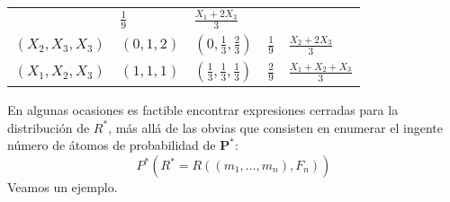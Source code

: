 \documentclass[
]{book}
\theoremstyle{definition}
\theoremstyle{definition}
\theoremstyle{definition}
\theoremstyle{remark}
\begin{document}
\begin{longtable}[]{@{}lllll@{}}
\begin{minipage}[t]{0.16\columnwidth}
\end{minipage} & \begin{minipage}[t]{0.17\columnwidth}\raggedright
\(\frac{1}{9}\)\strut
\end{minipage} & \begin{minipage}[t]{0.18\columnwidth}\raggedright
\(\frac{X_1+2X_3}{3}\)\strut
\end{minipage}\tabularnewline
\begin{minipage}[t]{0.18\columnwidth}\raggedright
\(\left( X_2,X_3,X_3 \right)\)\strut
\end{minipage} & \begin{minipage}[t]{0.16\columnwidth}\raggedright
\(\left( 0,1,2 \right)\)\strut
\end{minipage} & \begin{minipage}[t]{0.16\columnwidth}\raggedright
\(\left( 0,\frac{1}{3},\frac{2}{3} \right)\)\strut
\end{minipage} & \begin{minipage}[t]{0.17\columnwidth}\raggedright
\(\frac{1}{9}\)\strut
\end{minipage} & \begin{minipage}[t]{0.18\columnwidth}\raggedright
\(\frac{X_2+2X_3}{3}\)\strut
\end{minipage}\tabularnewline
\begin{minipage}[t]{0.18\columnwidth}\raggedright
\(\left( X_1,X_2,X_3 \right)\)\strut
\end{minipage} & \begin{minipage}[t]{0.16\columnwidth}\raggedright
\(\left( 1,1,1 \right)\)\strut
\end{minipage} & \begin{minipage}[t]{0.16\columnwidth}\raggedright
\(\left( \frac{1}{3},\frac{1}{3},\frac{1}{3} \right)\)\strut
\end{minipage} & \begin{minipage}[t]{0.17\columnwidth}\raggedright
\(\frac{2}{9}\)\strut
\end{minipage} & \begin{minipage}[t]{0.18\columnwidth}\raggedright
\(\frac{X_1+X_2+X_3}{3}\)\strut
\end{minipage}\tabularnewline
\bottomrule
\end{longtable}

En algunas ocasiones es factible encontrar expresiones cerradas
para la distribución de \(R^{\ast}\), más allá de las obvias que
consisten en enumerar el ingente número de átomos de probabilidad de
\(\mathbf{P}^{\ast}\):
\[P^{\ast}\left( R^{\ast}=R\left( \left( m_1,\ldots ,m_n \right)
,F_n \right) \right)\]
Veamos un ejemplo.
\end{document}
